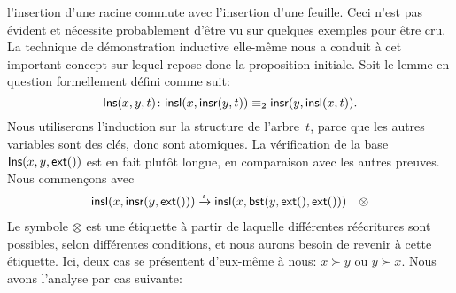 l'insertion d'une racine commute avec l'insertion d'une feuille. Ceci
n'est pas évident et nécessite probablement d'être vu sur quelques
exemples pour être cru. La technique de démonstration inductive
elle-même nous a conduit à cet important concept sur lequel repose
donc la proposition initiale. Soit le lemme en question formellement
défini comme suit:
\begin{equation*}
\pred{Ins}{x,y,t} \colon \fun{insl}(x,\fun{insr}(y,t))
\equiv_2 \fun{insr}(y,\fun{insl}(x,t)).
\index{Ins@\predName{Ins}}
\end{equation*}
Nous utiliserons l'induction sur la structure de l'arbre~\(t\), parce
que les autres variables sont des clés, donc sont atomiques. La
vérification de la base \(\textsf{Ins}({x,y,\textsf{ext}()})\) est en fait
plutôt longue, en comparaison avec les autres preuves. Nous
commençons avec
\begin{equation*}
\begin{array}{@{}r@{\;}l@{\;}l@{\quad}r@{}}
  \fun{insl}(x,\fun{insr}(y,\fun{ext}()))
& \xrightarrow{\smash{\iota}} &
  \fun{insl}(x,\fun{bst}(y,\fun{ext}(),\fun{ext}())) & \otimes
\end{array}
\end{equation*}
Le symbole \(\otimes\) est une étiquette à partir de laquelle
différentes réécritures sont possibles, selon différentes conditions,
et nous aurons besoin de revenir à cette étiquette. Ici, deux cas se
présentent d'eux-même à nous: \(x \succ y\) ou \(y \succ x\). Nous
avons l'analyse par cas suivante:
